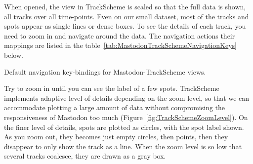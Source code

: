 When opened, the view in TrackScheme is scaled so that the full data is shown, all tracks over all time-points. 
Even on our small dataset, most of the tracks and spots appear as single lines or dense boxes.
To see the details of each track, you need to zoom in and navigate around the data.
The navigation actions their mappings are listed in the table~\ref{tab:MastodonTrackSchemeNavigationKeys} below.

\begin{table}[!htbp]
    \centering
    \caption{Default navigation key-bindings for Mastodon-TrackScheme views.}
    
    \label{tab:MastodonTrackSchemeNavigationKeys}
\end{table}

Try to zoom in until you can see the label of a few spots.
TrackScheme implements adaptive level of details depending on the zoom level, so that we can accommodate plotting a large amount of data without compromising the responsiveness of Mastodon too much (Figure~\ref{fig:TrackSchemeZoomLevel}).
On the finer level of details, spots are plotted as circles, with the spot label shown.
As you zoom out, they becomes just empty circles, then points, then they disappear to only show the track as a line.
When the zoom level is so low that several tracks coalesce, they are drawn as a gray box. 

